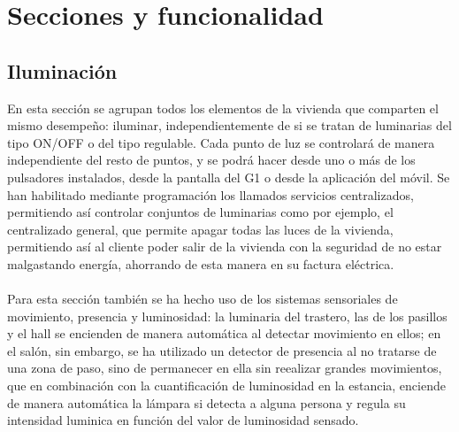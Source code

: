 \section{Secciones y funcionalidad}

\subsection{Iluminación}En esta sección se agrupan todos los elementos de la vivienda que comparten el mismo desempeño: iluminar, independientemente de si se tratan de luminarias del tipo ON/OFF o del tipo regulable. Cada punto de luz se controlará de manera independiente del resto de puntos, y se podrá hacer desde uno o más de los pulsadores instalados, desde la pantalla del G1 o desde la aplicación del móvil. Se han habilitado mediante programación los llamados servicios centralizados, permitiendo así controlar conjuntos de luminarias como por ejemplo, el centralizado general, que permite apagar todas las luces de la vivienda, permitiendo así al cliente poder salir de la vivienda con la seguridad de no estar malgastando energía, ahorrando de esta manera en su factura eléctrica. \\\\ Para esta sección también se ha hecho uso de los sistemas sensoriales de movimiento, presencia y luminosidad: la luminaria del trastero, las de los pasillos y el hall se encienden de manera automática al detectar movimiento en ellos; en el salón, sin embargo, se ha utilizado un detector de presencia al no tratarse de una zona de paso, sino de permanecer en ella sin reealizar grandes movimientos, que en combinación con la cuantificación de luminosidad en la estancia, enciende de manera automática la lámpara si detecta a alguna persona y regula su intensidad luminica en función del valor de luminosidad sensado.\\
